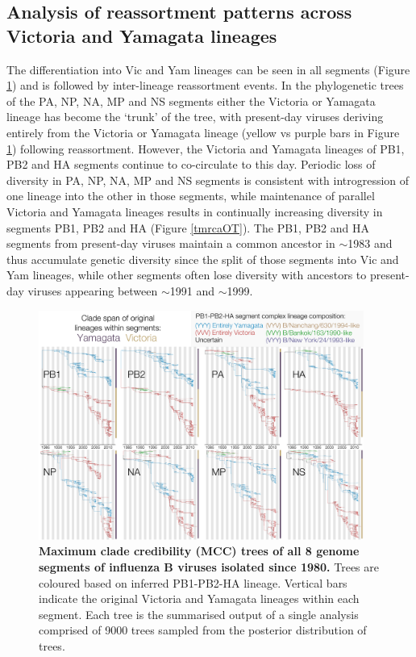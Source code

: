 \documentclass[11pt,oneside,letterpaper]{article}
\begin{document}
\subsection*{Analysis of reassortment patterns across Victoria and Yamagata lineages}
The differentiation into Vic and Yam lineages can be seen in all segments (Figure \ref{genomeGrid}) and is followed by inter-lineage reassortment events.
In the phylogenetic trees of the PA, NP, NA, MP and NS segments either the Victoria or Yamagata lineage has become the `trunk' of the tree, with present-day viruses deriving entirely from the Victoria or Yamagata lineage (yellow vs purple bars in Figure \ref{genomeGrid}) following reassortment.
However, the Victoria and Yamagata lineages of PB1, PB2 and HA segments continue to co-circulate to this day.
Periodic loss of diversity in PA, NP, NA, MP and NS segments is consistent with introgression of one lineage into the other in those segments, while maintenance of parallel Victoria and Yamagata lineages results in continually increasing diversity in segments PB1, PB2 and HA (Figure \ref{tmrcaOT}).
The PB1, PB2 and HA segments from present-day viruses maintain a common ancestor in $\sim$1983 and thus accumulate genetic diversity since the split of those segments into Vic and Yam lineages, while other segments often lose diversity with ancestors to present-day viruses appearing between $\sim$1991 and $\sim$1999.

\begin{figure}[h]
\centering
\includegraphics[width=0.95\textwidth]{figures/InfB_genomeGrid.pdf}
\caption{\textbf{Maximum clade credibility (MCC) trees of all 8 genome segments of influenza B viruses isolated since 1980.}
Trees are coloured based on inferred PB1-PB2-HA lineage.
Vertical bars indicate the original Victoria and Yamagata lineages within each segment.
Each tree is the summarised output of a single analysis comprised of 9000 trees sampled from the posterior distribution of trees.}
\label{genomeGrid}
\end{figure}
\end{document}
